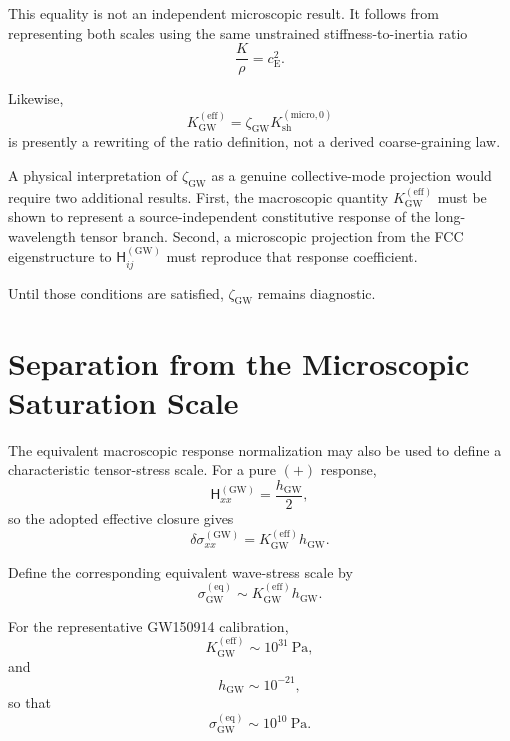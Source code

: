 This equality is not an independent microscopic result. It follows from representing both scales using the same unstrained stiffness-to-inertia ratio
\begin{equation}
    \frac{K}{\rho} = c_{\mathrm{E}}^2.
\end{equation}

Likewise,
\begin{equation}
    K_{\mathrm{GW}}^{(\mathrm{eff})} = \zeta_{\mathrm{GW}} K_{\mathrm{sh}}^{(\mathrm{micro},0)}
\end{equation}
is presently a rewriting of the ratio definition, not a derived coarse-graining law.

A physical interpretation of $\zeta_{\mathrm{GW}}$ as a genuine collective-mode projection would require two additional results. First, the macroscopic quantity $K_{\mathrm{GW}}^{(\mathrm{eff})}$ must be shown to represent a source-independent constitutive response of the long-wavelength tensor branch. Second, a microscopic projection from the FCC eigenstructure to $\mathsf{H}_{ij}^{(\mathrm{GW})}$ must reproduce that response coefficient.

Until those conditions are satisfied, $\zeta_{\mathrm{GW}}$ remains diagnostic.

\section{Separation from the Microscopic Saturation Scale}

The equivalent macroscopic response normalization may also be used to define a characteristic tensor-stress scale. For a pure $(+)$ response,
\begin{equation}
    \mathsf{H}_{xx}^{(\mathrm{GW})} = \frac{ h_{\mathrm{GW}} }{2},
\end{equation}
so the adopted effective closure gives
\begin{equation}
    \delta\sigma_{xx}^{(\mathrm{GW})} = K_{\mathrm{GW}}^{(\mathrm{eff})} h_{\mathrm{GW}}.
\end{equation}

Define the corresponding equivalent wave-stress scale by
\begin{equation}
    \sigma_{\mathrm{GW}}^{(\mathrm{eq})} \sim K_{\mathrm{GW}}^{(\mathrm{eff})} h_{\mathrm{GW}}.
\end{equation}

For the representative GW150914 calibration,
\begin{equation}
    K_{\mathrm{GW}}^{(\mathrm{eff})} \sim 10^{31}\ \mathrm{Pa},
\end{equation}
and
\begin{equation}
    h_{\mathrm{GW}} \sim 10^{-21},
\end{equation}
so that
\begin{equation}
    \sigma_{\mathrm{GW}}^{(\mathrm{eq})} \sim 10^{10}\ \mathrm{Pa}.
\end{equation}

